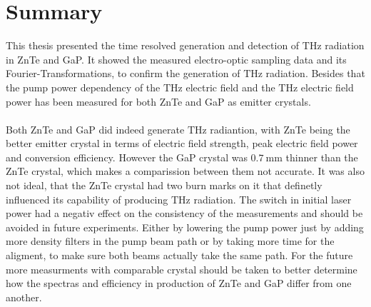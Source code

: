 \chapter{Summary}
This thesis presented the time resolved generation and detection of $\si{\tera\hertz}$ radiation in ZnTe and GaP.
It showed the measured electro-optic sampling data and its Fourier-Transformations, to confirm the generation of $\si{\tera\hertz}$ radiation.
Besides that the pump power dependency of the $\si{\tera\hertz}$ electric field and the $\si{\tera\hertz}$ electric field power has been measured for both ZnTe and GaP as emitter crystals.
\\\\
Both ZnTe and GaP did indeed generate $\si{\tera\hertz}$ radiantion, with ZnTe being the better emitter crystal in terms of electric field strength, peak electric field power and conversion efficiency.
However the GaP crystal was $\SI{0.7}{\milli\meter}$ thinner than the ZnTe crystal, which makes a comparission between them not accurate.
It was also not ideal, that the ZnTe crystal had two burn marks on it that definetly influenced its capability of producing $\si{\tera\hertz}$ radiation.
The switch in initial laser power had a negativ effect on the consistency of the measurements and should be avoided in future experiments.
Either by lowering the pump power just by adding more density filters in the pump beam path or by taking more time for the aligment, to make sure both beams actually take the same path.
For the future more measurments with comparable crystal should be taken to better determine how the spectras and efficiency in production of ZnTe and GaP differ from one another.
